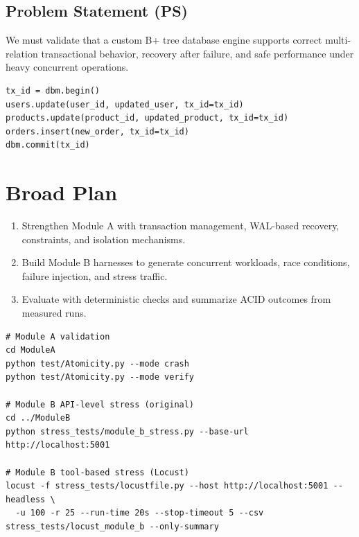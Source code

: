 \documentclass[12pt,a4paper]{article}
\begin{document}
\subsection{Problem Statement (PS)}
We must validate that a custom B+ tree database engine supports correct multi-relation transactional behavior, recovery after failure, and safe performance under heavy concurrent operations.

\begin{lstlisting}[style=python, caption={Minimal three-table transactional scenario targeted by Assignment 3}]
tx_id = dbm.begin()
users.update(user_id, updated_user, tx_id=tx_id)
products.update(product_id, updated_product, tx_id=tx_id)
orders.insert(new_order, tx_id=tx_id)
dbm.commit(tx_id)
\end{lstlisting}

\section{Broad Plan}

\begin{enumerate}[noitemsep]
  \item Strengthen Module A with transaction management, WAL-based recovery, constraints, and isolation mechanisms.
  \item Build Module B harnesses to generate concurrent workloads, race conditions, failure injection, and stress traffic.
  \item Evaluate with deterministic checks and summarize ACID outcomes from measured runs.
\end{enumerate}

\begin{lstlisting}[basicstyle=\ttfamily\small, caption={Execution plan used in practice}]
# Module A validation
cd ModuleA
python test/Atomicity.py --mode crash
python test/Atomicity.py --mode verify

# Module B API-level stress (original)
cd ../ModuleB
python stress_tests/module_b_stress.py --base-url http://localhost:5001

# Module B tool-based stress (Locust)
locust -f stress_tests/locustfile.py --host http://localhost:5001 --headless \
  -u 100 -r 25 --run-time 20s --stop-timeout 5 --csv stress_tests/locust_module_b --only-summary
\end{lstlisting}
\end{document}
